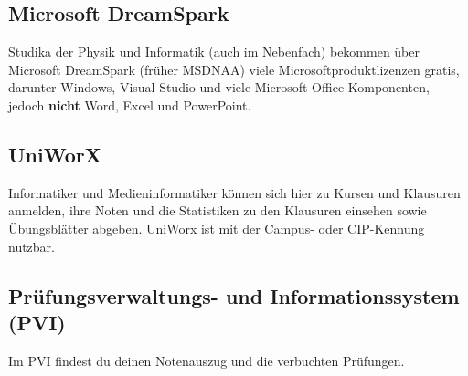 \subsection*{Microsoft DreamSpark \subjectList{\subjectI{}\subjectMI{}\subjectP{}}}
Studika der Physik und Informatik (auch im Nebenfach) bekommen über
Microsoft DreamSpark (früher MSDNAA) viele Microsoftproduktlizenzen
gratis, darunter Windows, Visual Studio und viele
Microsoft Office-Komponenten, jedoch \textbf{nicht} Word, Excel und PowerPoint.

\begin{urlList}
\end{urlList}

\subsection*{UniWorX\subjectList{\subjectI{}\subjectMI{}}}

Informatiker und Medieninformatiker können sich hier zu Kursen und Klausuren anmelden, ihre Noten und die Statistiken zu den Klausuren einsehen sowie Übungsblätter abgeben. UniWorx ist mit der Campus- oder CIP-Kennung nutzbar.


\begin{urlList}
\end{urlList}

\subsection*{Prüfungsverwaltungs- und Informationssystem (PVI)\subjectList{\subjectI{}\subjectMI{}}}

Im PVI findest du deinen Notenauszug und die verbuchten Prüfungen.


